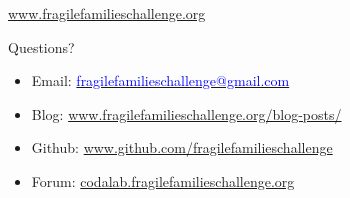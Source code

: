 \documentclass{beamer}
\begin{document}
\begin{frame}

\begin{center}
\Large{\textcolor{blue}{\href{http://www.fragilefamilieschallenge.org}{www.fragilefamilieschallenge.org}}} 
\end{center}

\vfill

Questions? 
\begin{itemize}
\item Email: \href{mailto:fragilefamilieschallenge@gmail.com}{\textcolor{blue}{fragilefamilieschallenge@gmail.com}} 
\item Blog: \small{\textcolor{blue}{\href{http://www.fragilefamilieschallenge.org/blog-posts/}{www.fragilefamilieschallenge.org/blog-posts/}}}
\item Github: \small{\textcolor{blue}{\href{http://github.com/fragilefamilieschallenge}{www.github.com/fragilefamilieschallenge}}}
\item Forum: \small{\textcolor{blue}{\href{http://codalab.fragilefamilieschallenge.org}{codalab.fragilefamilieschallenge.org}}}
\end{itemize}

\end{frame}
\end{document}
